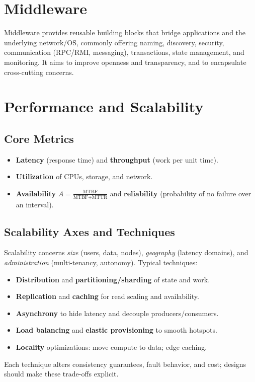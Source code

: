 \documentclass[a4paper,12pt]{book}
\begin{document}
\section{Middleware}
Middleware provides reusable building blocks that bridge applications and the underlying network/OS, commonly offering naming, discovery, security, communication (RPC/RMI, messaging), transactions, state management, and monitoring. It aims to improve openness and transparency, and to encapsulate cross-cutting concerns.

\section{Performance and Scalability}
\subsection{Core Metrics}
\begin{itemize}
  \item \textbf{Latency} (response time) and \textbf{throughput} (work per unit time).
  \item \textbf{Utilization} of CPUs, storage, and network.
  \item \textbf{Availability} \(A = \tfrac{\text{MTBF}}{\text{MTBF}+\text{MTTR}}\) and \textbf{reliability} (probability of no failure over an interval).
\end{itemize}

\subsection{Scalability Axes and Techniques}
Scalability concerns \emph{size} (users, data, nodes), \emph{geography} (latency domains), and \emph{administration} (multi-tenancy, autonomy). Typical techniques:
\begin{itemize}
  \item \textbf{Distribution} and \textbf{partitioning/sharding} of state and work.
  \item \textbf{Replication} and \textbf{caching} for read scaling and availability.
  \item \textbf{Asynchrony} to hide latency and decouple producers/consumers.
  \item \textbf{Load balancing} and \textbf{elastic provisioning} to smooth hotspots.
  \item \textbf{Locality} optimizations: move compute to data; edge caching.
\end{itemize}
Each technique alters consistency guarantees, fault behavior, and cost; designs should make these trade-offs explicit.
\end{document}
